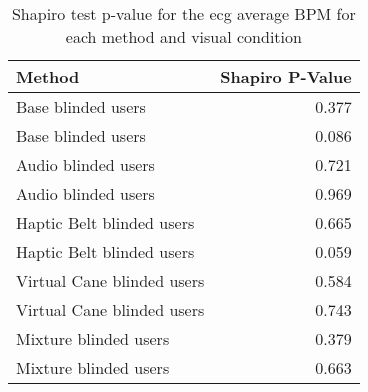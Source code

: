 
\begin{table}[!htb]
\centering
\caption{Shapiro test p-value for the ecg average BPM for each method and visual condition}
\label{tab:shapiro_ecg_bpm}
\begin{tabular}{lr}
\toprule
                    Method &  Shapiro P-Value \\
\midrule
        Base blinded users &            0.377 \\
        Base blinded users &            0.086 \\
       Audio blinded users &            0.721 \\
       Audio blinded users &            0.969 \\
 Haptic Belt blinded users &            0.665 \\
 Haptic Belt blinded users &            0.059 \\
Virtual Cane blinded users &            0.584 \\
Virtual Cane blinded users &            0.743 \\
     Mixture blinded users &            0.379 \\
     Mixture blinded users &            0.663 \\
\bottomrule
\end{tabular}
\end{table}

